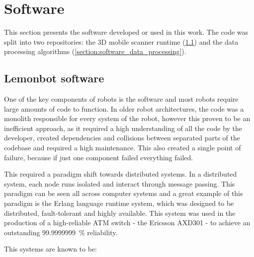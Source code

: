 \section{Software}
\label{section:software}

This section presents the software developed or used in this work. The code was split into two repositories: the 3D mobile scanner runtime (\cref{section:software_lemonbot_software}) and the data processing algorithms (\cref{section:software_data_processing}).

\subsection{Lemonbot software}
\label{section:software_lemonbot_software}

One of the key components of robots is the software and most robots require large amounts of code to function. In older robot architectures, the code was a monolith responsible for every system of the robot, however this proven to be an inefficient approach, as it required a high understanding of all the code by the developer, created dependencies and collisions between separated parts of the codebase and required a high maintenance. This also created a single point of failure, because if just one component failed everything failed. 

This required a paradigm shift towards distributed systems. In a distributed system, each node runs isolated and interact through message passing. This paradigm can be seen all across computer systems and a great example of this paradigm is the Erlang language runtime system, which was designed to be distributed, fault-tolerant and highly available. This system was used in the production of a high-reliable ATM switch - the Ericsson AXD301 - to achieve an outstanding \SI{99.9999999}{\percent} reliability.

This systems are known to be:

